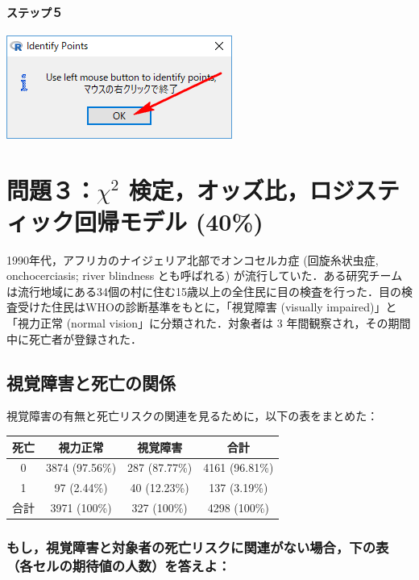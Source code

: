 \documentclass[11pt,]{problemset}
\let\oldparagraph\paragraph
\renewcommand{\paragraph}[1]{\oldparagraph{#1}\mbox{}}
\begin{document}
\hypertarget{-16}{%
\paragraph{ステップ５}\label{-16}}

\begin{center}\includegraphics[width=0.25\linewidth]{pic/scatter07} \end{center}

\hypertarget{chi2--40}{%
\section{\texorpdfstring{問題３：\(\chi^2\)
検定，オッズ比，ロジスティック回帰モデル
(40\%)}{問題３：\textbackslash{}chi\^{}2 検定，オッズ比，ロジスティック回帰モデル (40\%)}}\label{chi2--40}}

1990年代，アフリカのナイジェリア北部でオンコセルカ症 (回旋糸状虫症,
onchocerciasis; river blindness とも呼ばれる)
が流行していた．ある研究チームは流行地域にある34個の村に住む15歳以上の全住民に目の検査を行った．目の検査受けた住民はWHOの診断基準をもとに，「視覚障害
(visually impaired)」と「視力正常 (normal vision」に分類された．対象者は
3 年間観察され，その期間中に死亡者が登録された．

\subsection{視覚障害と死亡の関係}

視覚障害の有無と死亡リスクの関連を見るために，以下の表をまとめた：

\begin{center}
\begin{tabular}{|c|c|c|c|}
\hline
死亡 & 視力正常           & 視覚障害          & 合計             \\ \hline
0  & 3874 (97.56\%) & 287 (87.77\%) & 4161 (96.81\%) \\ \hline
1  & 97 (2.44\%)    & 40 (12.23\%)  & 137 (3.19\%)   \\ \hline
合計 & 3971 (100\%)   & 327 (100\%)   & 4298 (100\%)   \\ \hline
\end{tabular}
\end{center}

\subsubsection{もし，視覚障害と対象者の死亡リスクに関連がない場合，下の表（各セルの期待値の人数）を答えよ：}
\end{document}
